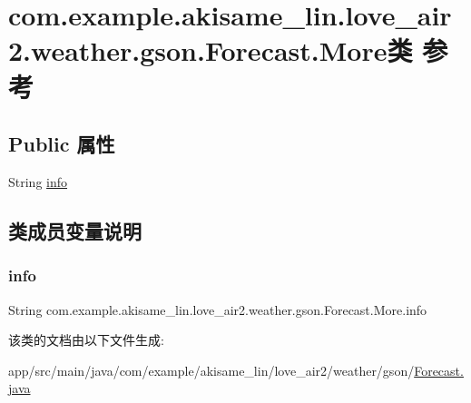 \hypertarget{classcom_1_1example_1_1akisame__lin_1_1love__air2_1_1weather_1_1gson_1_1_forecast_1_1_more}{}\section{com.\+example.\+akisame\+\_\+lin.\+love\+\_\+air2.\+weather.\+gson.\+Forecast.\+More类 参考}
\label{classcom_1_1example_1_1akisame__lin_1_1love__air2_1_1weather_1_1gson_1_1_forecast_1_1_more}
\subsection*{Public 属性}
\begin{DoxyCompactItemize}
\item 
String \mbox{\hyperlink{classcom_1_1example_1_1akisame__lin_1_1love__air2_1_1weather_1_1gson_1_1_forecast_1_1_more_ac6af2bfab0684e160cedaf18648b041f}{info}}
\end{DoxyCompactItemize}


\subsection{类成员变量说明}
\mbox{\label{classcom_1_1example_1_1akisame__lin_1_1love__air2_1_1weather_1_1gson_1_1_forecast_1_1_more_ac6af2bfab0684e160cedaf18648b041f}} 
\subsubsection{\texorpdfstring{info}{info}}
{\footnotesize\ttfamily String com.\+example.\+akisame\+\_\+lin.\+love\+\_\+air2.\+weather.\+gson.\+Forecast.\+More.\+info}



该类的文档由以下文件生成\+:\begin{DoxyCompactItemize}
\item 
app/src/main/java/com/example/akisame\+\_\+lin/love\+\_\+air2/weather/gson/\mbox{\hyperlink{java_2com_2example_2akisame__lin_2love__air2_2weather_2gson_2_forecast_8java}{Forecast.\+java}}\end{DoxyCompactItemize}
